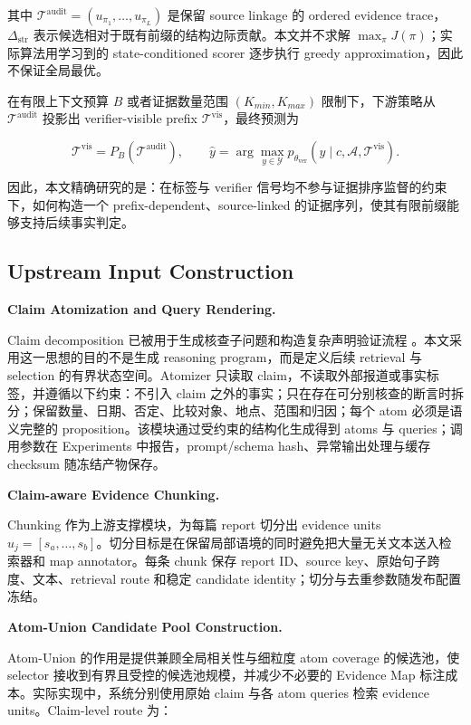 \documentclass[letterpaper]{article}
\begin{document}
其中 $\mathcal T^{\mathrm{audit}}=(u_{\pi_1},\ldots,u_{\pi_L})$ 是保留 source linkage 的 ordered evidence trace，$\Delta_{\mathrm{str}}$ 表示候选相对于既有前缀的结构边际贡献。本文并不求解 $\max_\pi J(\pi)$；实际算法用学习到的 state-conditioned scorer 逐步执行 greedy approximation，因此不保证全局最优。

在有限上下文预算 $B$ 或者证据数量范围 $(K_{min}, K_{max})$ 限制下，下游策略从 $\mathcal T^{\mathrm{audit}}$ 投影出 verifier-visible prefix $\mathcal T^{\mathrm{vis}}$，最终预测为

\[
\mathcal T^{\mathrm{vis}}=P_B(\mathcal T^{\mathrm{audit}}),
\qquad
\hat y=\arg\max_{y\in\mathcal Y}
p_{\theta_{\mathrm{ver}}}(y\mid c,\mathcal A,\mathcal T^{\mathrm{vis}}).
\]

因此，本文精确研究的是：在标签与 verifier 信号均不参与证据排序监督的约束下，如何构造一个 prefix-dependent、source-linked 的证据序列，使其有限前缀能够支持后续事实判定。

\subsection{Upstream Input Construction}

\textbf{Claim Atomization and Query Rendering.}

Claim decomposition 已被用于生成核查子问题和构造复杂声明验证流程 \citep{Chen2022ClaimDecomp,Pan2023ProgramFC,Chen2023WildEvidence}。本文采用这一思想的目的不是生成 reasoning program，而是定义后续 retrieval 与 selection 的有界状态空间。Atomizer 只读取 claim，不读取外部报道或事实标签，并遵循以下约束：不引入 claim 之外的事实；只在存在可分别核查的断言时拆分；保留数量、日期、否定、比较对象、地点、范围和归因；每个 atom 必须是语义完整的 proposition。该模块通过受约束的结构化生成得到 atoms 与 queries；调用参数在 Experiments 中报告，prompt/schema hash、异常输出处理与缓存 checksum 随冻结产物保存。

\textbf{Claim-aware Evidence Chunking.}

Chunking 作为上游支撑模块，为每篇 report 切分出 evidence units $u_j=[s_a,\ldots,s_b]$。切分目标是在保留局部语境的同时避免把大量无关文本送入检索器和 map annotator。每条 chunk 保存 report ID、source key、原始句子跨度、文本、retrieval route 和稳定 candidate identity；切分与去重参数随发布配置冻结。

\textbf{Atom-Union Candidate Pool Construction.}

Atom-Union 的作用是提供兼顾全局相关性与细粒度 atom coverage 的候选池，使 selector 接收到有界且受控的候选池规模，并减少不必要的 Evidence Map 标注成本。实际实现中，系统分别使用原始 claim 与各 atom queries 检索 evidence units。Claim-level route 为：
\end{document}
